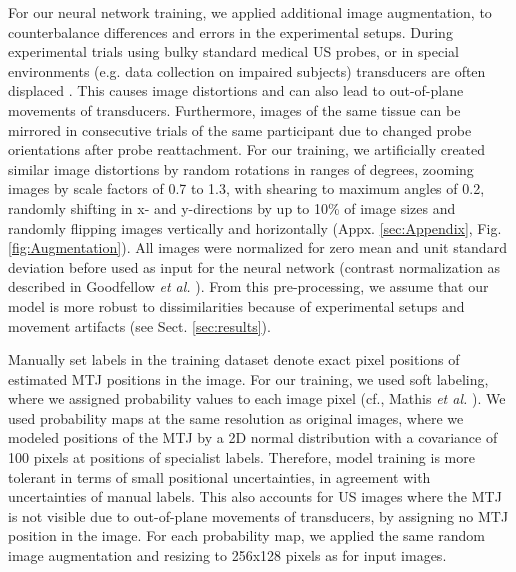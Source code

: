 \documentclass[journal,twoside,web]{ieeecolor}
\begin{document}
For our neural network training, we applied additional image augmentation, to counterbalance differences and errors in the experimental setups. During experimental trials using bulky standard medical US probes, or in special environments (e.g. data collection on impaired subjects) transducers are often displaced \cite{j:Leitner2019}. This causes image distortions and can also lead to out-of-plane movements of transducers. Furthermore, images of the same tissue can be mirrored in consecutive trials of the same participant due to changed probe orientations after probe reattachment. For our training, we artificially created similar image distortions by random rotations in ranges of  degrees, zooming images by scale factors of 0.7 to 1.3, with shearing to maximum angles of 0.2, randomly shifting in x- and y-directions by up to 10\% of image sizes and randomly flipping images vertically and horizontally (Appx. \ref{sec:Appendix}, Fig.\ref{fig:Augmentation}). All images were normalized for zero mean and unit standard deviation before used as input for the neural network (contrast normalization as described in Goodfellow \textit{et al.} \cite{Goodfellow-et-al-2016}). From this pre-processing, we assume that our model is more robust to dissimilarities because of experimental setups and movement artifacts (see Sect. \ref{sec:results}).

Manually set labels in the training dataset denote exact pixel positions of estimated MTJ positions in the image. For our training, we used soft labeling, where we assigned probability values to each image pixel (cf., Mathis \textit{et al.} \cite{j:Mathis2018}). We used probability maps at the same resolution as original images, where we modeled positions of the MTJ by a 2D normal distribution with a covariance of 100 pixels at positions of specialist labels. Therefore, model training is more tolerant in terms of small positional uncertainties, in agreement with uncertainties of manual labels. This also accounts for US images where the MTJ is not visible due to out-of-plane movements of transducers, by assigning no MTJ position in the image. For each probability map, we applied the same random image augmentation and resizing to 256x128 pixels as for input images.
\end{document}
